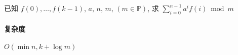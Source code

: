 已知 \(f(0),\dots,f(k-1)\), \(a\), \(n\), \(m\), \((m\in\mathbb{P})\), 求 \(\displaystyle \sum_{i=0}^{n-1} a^i f(i)\bmod{m}\)

\paragraph{复杂度} \(O(\min{n,k}+\log m)\)